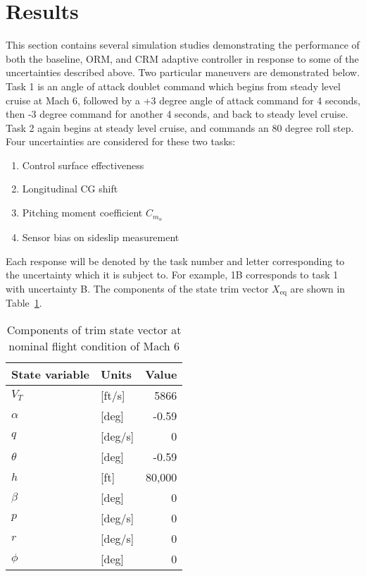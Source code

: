 \section{Results}

This section contains several simulation studies demonstrating the performance of both the baseline, ORM, and CRM adaptive controller in response to some of the uncertainties described above.
Two particular maneuvers are demonstrated below.
Task 1 is an angle of attack doublet command which begins from steady level cruise at Mach 6, followed by a +3 degree angle of attack command for 4 seconds, then -3 degree command for another 4 seconds, and back to steady level cruise.
Task 2 again begins at steady level cruise, and commands an 80 degree roll step.
Four uncertainties are considered for these two tasks:
\begin{enumerate}[label=\Alph*),itemsep=2pt,parsep=2pt,topsep=0pt,partopsep=0pt] %
  \item{Control surface effectiveness}
  \item{Longitudinal CG shift}
  \item{Pitching moment coefficient $C_{m_{\alpha}}$}
  \item{Sensor bias on sideslip measurement}
\end{enumerate}
Each response will be denoted by the task number and letter corresponding to the uncertainty which it is subject to.
For example, 1B corresponds to task 1 with uncertainty B.
The components of the state trim vector $X_{\text{eq}}$ are shown in Table~\ref{tab:trimstate}.

\begin{table}[H]
  \centering
  \caption{Components of trim state vector at nominal flight condition of Mach 6}
  \small
  \begin{tabular}{llr}
    \toprule
    State variable & Units & Value \\
    \midrule
    $V_{T}$ & [ft/s] & 5866 \\
    $\alpha$ & [deg] & -0.59 \\
    $q$ & [deg/s] & 0 \\
    $\theta$ & [deg] & -0.59 \\
    $h$ & [ft] & 80,000 \\
    $\beta$ & [deg] & 0 \\
    $p$ & [deg/s] & 0 \\
    $r$ & [deg/s] & 0 \\
    $\phi$ & [deg] & 0 \\
    \bottomrule
  \end{tabular}\label{tab:trimstate}
\end{table}

